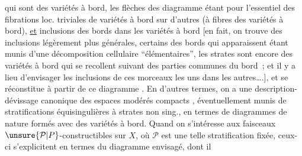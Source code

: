 %
qui sont des variétés à bord, les  flèches des
diagramme étant pour l'essentiel des fibrations
loc. triviales de variétés à bord sur d'autres
(à fibres des variétés à bord), \uline{et}  inclusions
des bords dans les variétés à bord \deleted{(}[en
fait, on trouve des inclusions légèrement
plus générales, certains des bords qui apparaissent
étant munis d'une décomposition
cellulaire ``élémentaires'',  les
strates  sont encore des variétés à bord qui se
recollent suivant des parties communes du
bord~; et il y a lieu d'envisager  les inclusions
de ces morceaux les uns dans les
autres\ldots.\deleted{)}], et se réconstitue à partir de
ce diagramme . En d'autres termes, on
a une description-dévissage canonique
des espaces modérés compacts , éventuellement
munis de stratifications équisingulières
à strates non sing., en termes de diagrammes
 de nature  formés avec des variétés
à bord. Quand on s'intéresse aux faisceaux
$\unsure{\mathcal{P}|P}$-constructibles sur $X$, où $\mathcal{P}$ est une telle
stratification fixée, ceux-ci s'explicitent en
termes du diagramme envisagé, dont il
